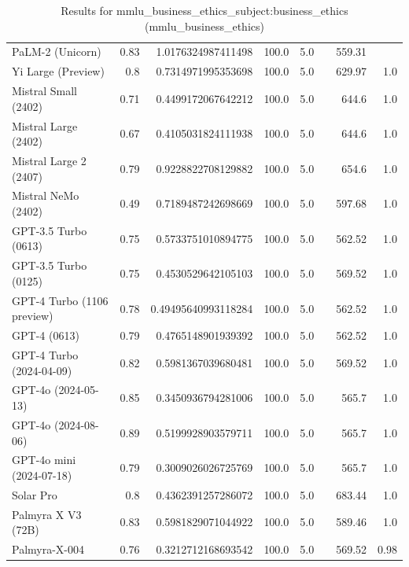 \begin{table}[htp]
{\begin{tabular}{lrrrrrrr}
PaLM-2 (Unicorn) & 0.83 & 1.0176324987411498 & 100.0 & 5.0 &  & 559.31 &  \\
Yi Large (Preview) & 0.8 & 0.7314971995353698 & 100.0 & 5.0 &  & 629.97 & 1.0 \\
Mistral Small (2402) & 0.71 & 0.4499172067642212 & 100.0 & 5.0 &  & 644.6 & 1.0 \\
Mistral Large (2402) & 0.67 & 0.4105031824111938 & 100.0 & 5.0 &  & 644.6 & 1.0 \\
Mistral Large 2 (2407) & 0.79 & 0.9228822708129882 & 100.0 & 5.0 &  & 654.6 & 1.0 \\
Mistral NeMo (2402) & 0.49 & 0.7189487242698669 & 100.0 & 5.0 &  & 597.68 & 1.0 \\
GPT-3.5 Turbo (0613) & 0.75 & 0.5733751010894775 & 100.0 & 5.0 &  & 562.52 & 1.0 \\
GPT-3.5 Turbo (0125) & 0.75 & 0.4530529642105103 & 100.0 & 5.0 &  & 569.52 & 1.0 \\
GPT-4 Turbo (1106 preview) & 0.78 & 0.49495640993118284 & 100.0 & 5.0 &  & 562.52 & 1.0 \\
GPT-4 (0613) & 0.79 & 0.4765148901939392 & 100.0 & 5.0 &  & 562.52 & 1.0 \\
GPT-4 Turbo (2024-04-09) & 0.82 & 0.5981367039680481 & 100.0 & 5.0 &  & 569.52 & 1.0 \\
GPT-4o (2024-05-13) & 0.85 & 0.3450936794281006 & 100.0 & 5.0 &  & 565.7 & 1.0 \\
GPT-4o (2024-08-06) & 0.89 & 0.5199928903579711 & 100.0 & 5.0 &  & 565.7 & 1.0 \\
GPT-4o mini (2024-07-18) & 0.79 & 0.3009026026725769 & 100.0 & 5.0 &  & 565.7 & 1.0 \\
Solar Pro & 0.8 & 0.4362391257286072 & 100.0 & 5.0 &  & 683.44 & 1.0 \\
Palmyra X V3 (72B) & 0.83 & 0.5981829071044922 & 100.0 & 5.0 &  & 589.46 & 1.0 \\
Palmyra-X-004 & 0.76 & 0.3212712168693542 & 100.0 & 5.0 &  & 569.52 & 0.98 \\
\bottomrule
\end{tabular}}
\caption{Results for mmlu_business_ethics_subject:business_ethics (mmlu_business_ethics)}
\label{fig:mmlu_business_ethics_subject:business_ethics (mmlu_business_ethics)}
\end{table}
